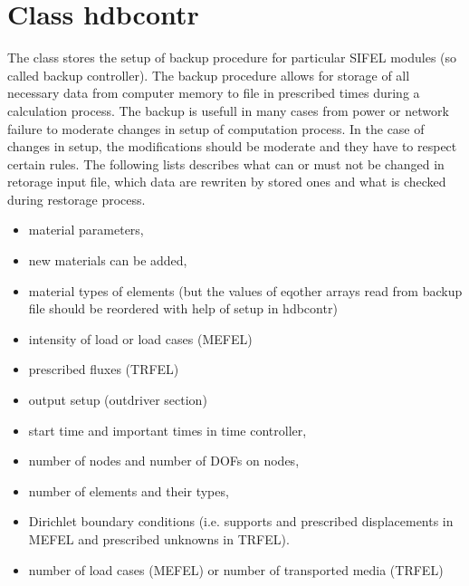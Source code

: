 \section {Class {\sf hdbcontr}}
The class stores the setup of backup procedure for particular SIFEL modules (so called backup controller). 
The backup procedure allows for storage of all necessary data from computer memory to file in prescribed 
times during a calculation process. The backup is usefull in many cases from power or network failure to 
moderate changes in setup of computation process. In the case of changes in setup, the modifications should 
be moderate and they have to respect certain rules. The following lists describes what can or must not be 
changed in retorage input file, which data are rewriten by stored ones and what is checked during 
restorage process.
\\

\begin{itemize}
\item material parameters,
\item new materials can be added,
\item material types of elements (but the values of eqother arrays read from backup file should
      be reordered with help of setup in {\sf hdbcontr})
\item intensity of load or load cases (MEFEL)
\item prescribed fluxes (TRFEL)
\item output setup (outdriver section)
\end{itemize}

\begin{itemize}
\item start time and important times in time controller,
\item number of nodes and number of DOFs on nodes,
\item number of elements and their types,
\item Dirichlet boundary conditions (i.e. supports and prescribed displacements in MEFEL and prescribed unknowns 
      in TRFEL).
\item number of load cases (MEFEL) or number of transported media (TRFEL)
\end{itemize}


